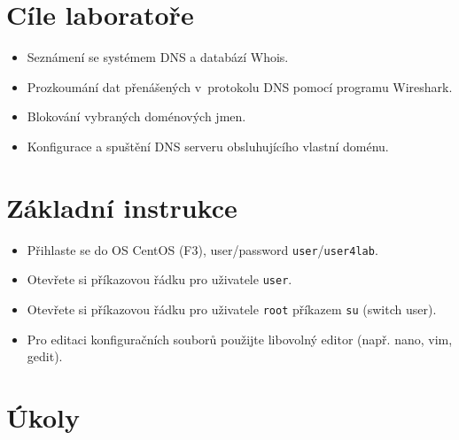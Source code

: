
\section*{Cíle laboratoře}
\begin{itemize}
  \item Seznámení se systémem DNS a databází Whois.
  \item Prozkoumání dat přenášených v~protokolu DNS pomocí programu Wireshark.
  \item Blokování vybraných doménových jmen.
  \item Konfigurace a spuštění DNS serveru obsluhujícího vlastní doménu.
\end{itemize}

\section*{Základní instrukce}
\begin{itemize}
  \item Přihlaste se do OS CentOS (F3), user/password {\tt user}/{\tt user4lab}.
  \item Otevřete si příkazovou řádku pro uživatele {\tt user}.
  \item Otevřete si příkazovou řádku pro uživatele {\tt root} příkazem {\tt su}
    (switch user).
  \item Pro editaci konfiguračních souborů použijte libovolný editor (např.
    nano, vim, gedit).
\end{itemize}

\section*{Úkoly}

